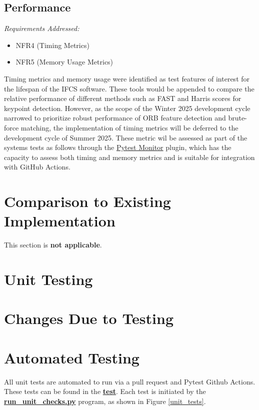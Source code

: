 \documentclass[12pt, titlepage]{article}
\begin{document}
\subsection{Performance}
\textit{Requirements Addressed:} 
\begin{itemize}
\item NFR4 (Timing Metrics)
\item NFR5 (Memory Usage Metrics)
\end{itemize}
Timing metrics and memory usage were identified as test features of interest for the lifespan of the IFCS software. These tools would be appended to compare the relative performance of different methods such as FAST and Harris scores for keypoint detection. However, as the scope of the Winter 2025 development cycle narrowed to prioritize robust performance of ORB feature detection and brute-force matching, the implementation of timing metrics will be deferred to the development cycle of Summer 2025. These metric wil be assessed as part of the systems tests as follows through the \href{https://pypi.org/project/pytest-monitor/}{Pytest Monitor} plugin, which has the capacity to assess both timing and memory metrics and is suitable for integration with GitHub Actions.

	
\section{Comparison to Existing Implementation}	

This section is \textbf{not applicable}.

\section{Unit Testing}

\section{Changes Due to Testing}


\section{Automated Testing}
All unit tests are automated to run via a pull request and Pytest Github Actions. These tests can be found in the \href{https://github.com/KiranSingh15/CAS-741-Image-Correspondences/tree/main/test}{\textbf{test}}. Each test is initiated by the \href{https://github.com/KiranSingh15/CAS-741-Image-Correspondences/blob/main/test/run_unit_checks.py}{\textbf{run\_unit\_checks.py}} program, as shown in Figure \ref{unit_tests}.
\end{document}
